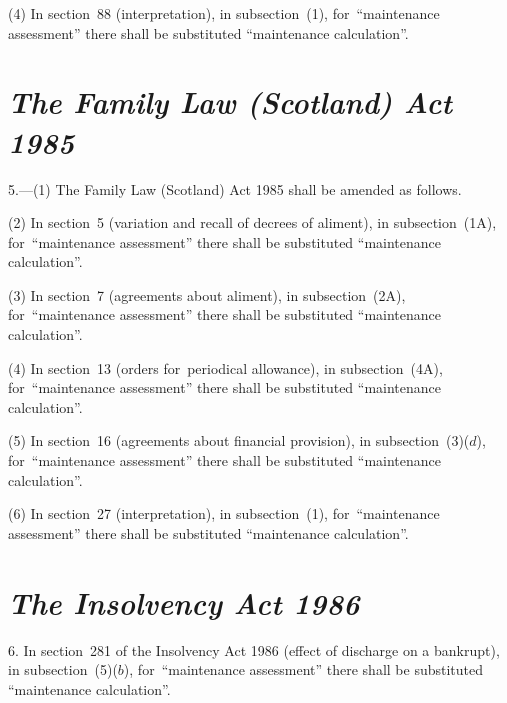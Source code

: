 \documentclass[12pt,a4paper]{article}
\begin{document}
(4) In section~88 (interpretation), in subsection~(1), for~“maintenance assessment” there shall be substituted “maintenance calculation”.


\section*{\itshape The Family Law (Scotland) Act 1985}

5.---(1) The Family Law (Scotland) Act 1985 shall be amended as follows.

(2) In section~5 (variation and recall of decrees of aliment), in subsection~(1A), for~“maintenance assessment” there shall be substituted “maintenance calculation”.

(3) In section~7 (agreements about aliment), in subsection~(2A), for~“maintenance assessment” there shall be substituted “maintenance calculation”.

(4) In section~13 (orders for~periodical allowance), in subsection~(4A), for~“maintenance assessment” there shall be substituted “maintenance calculation”.

\begin{sloppypar}
(5) In section~16 (agreements about financial provision), in subsection~(3)($d$), for~“maintenance assessment” there shall be substituted “maintenance calculation”.
\end{sloppypar}

(6) In section~27 (interpretation), in subsection~(1), for~“maintenance assessment” there shall be substituted “maintenance calculation”.


\section*{\itshape The Insolvency Act 1986}

6. In section~281 of the Insolvency Act 1986 (effect of discharge on a bankrupt), in subsection~(5)($b$), for~“maintenance assessment” there shall be substituted “maintenance calculation”.

\end{document}
